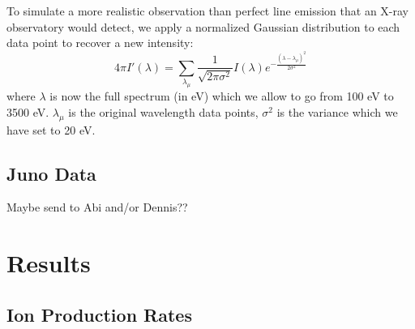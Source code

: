 \documentclass[draft]{agujournal2018}
\begin{document}
To simulate a more realistic observation than perfect line emission that an X-ray observatory would detect, we apply a normalized Gaussian distribution to each data point to recover a new intensity:
\begin{equation}
    4\pi I'(\lambda)=\sum_{\lambda_{\mu}}\frac{1}{\sqrt{2\pi\sigma^2}}I(\lambda)e^{-\frac{(\lambda-\lambda_{\mu})^2}{2\sigma^2}}
\end{equation}
where $\lambda$ is now the full spectrum (in eV) which we allow to go from 100 eV to 3500 eV. $\lambda_{\mu}$ is the original wavelength data points, $\sigma^2$ is the variance which we have set to 20 eV.

\subsection{Juno Data}

Maybe send to Abi and/or Dennis??

\section{Results}

\subsection{Ion Production Rates}
\end{document}
